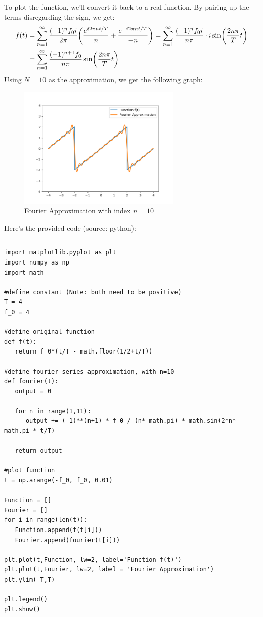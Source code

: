 \documentclass{article}
\DeclarePairedDelimiter{\paran}{(}{)}%
\begin{document}
\hfil

To plot the function, we'll convert it back to a real function. By pairing up the terms disregarding the sign, we get:
\begin{align}
    f(t)&= \sum_{n=1}^{\infty}\frac{(-1)^nf_0 i}{2\pi}\paran*{\frac{e^{i2\pi nt/T}}{n}+\frac{e^{-i2\pi nt/T}}{-n}} = \sum_{n=1}^{\infty}\frac{(-1)^nf_0 i}{n\pi}\cdot i\sin\paran*{\frac{2n\pi}{T}t}\\
    &= \sum_{n=1}^{\infty}\frac{(-1)^{n+1} f_0}{n\pi}\sin\paran*{\frac{2n\pi}{T}t}
\end{align}
Using $N=10$ as the approximation, we get the following graph:
\begin{figure}[h!]
    \begin{center}
        \includegraphics[width=78mm]{phys_103_hw2_q3_b.png}
        \caption{Fourier Approximation with index $n=10$}
    \end{center}
\end{figure}

Here's the provided code (source: python):

\rule{15.24cm}{0.01mm}
\begin{verbatim}
import matplotlib.pyplot as plt
import numpy as np
import math

#define constant (Note: both need to be positive)
T = 4
f_0 = 4

#define original function
def f(t):
   return f_0*(t/T - math.floor(1/2+t/T))

#define fourier series approximation, with n=10
def fourier(t):
   output = 0

   for n in range(1,11):
      output += (-1)**(n+1) * f_0 / (n* math.pi) * math.sin(2*n* math.pi * t/T)

   return output

#plot function
t = np.arange(-f_0, f_0, 0.01)

Function = []
Fourier = []
for i in range(len(t)):
   Function.append(f(t[i]))
   Fourier.append(fourier(t[i]))

plt.plot(t,Function, lw=2, label='Function f(t)')
plt.plot(t,Fourier, lw=2, label = 'Fourier Approximation')
plt.ylim(-T,T)

plt.legend()
plt.show()
\end{verbatim}
\end{document}
